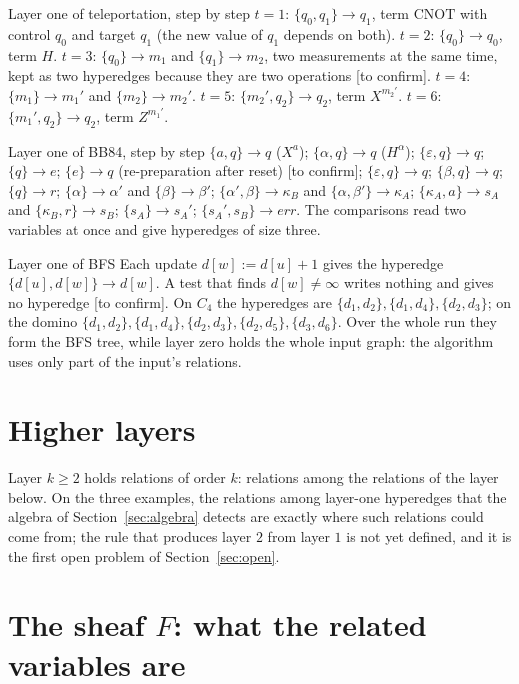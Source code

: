 \documentclass[11pt,a4paper]{article}
\newcommand{\tc}{\textsf{[to confirm]}}
\begin{document}
\begin{ex}{Layer one of teleportation, step by step}
$t=1$: $\{q_0,q_1\}\to q_1$, term $\mathrm{CNOT}$ with control $q_0$ and target $q_1$ (the new value of $q_1$ depends on both). $t=2$: $\{q_0\}\to q_0$, term $H$. $t=3$: $\{q_0\}\to m_1$ and $\{q_1\}\to m_2$, two measurements at the same time, kept as two hyperedges because they are two operations \tc. $t=4$: $\{m_1\}\to m_1'$ and $\{m_2\}\to m_2'$. $t=5$: $\{m_2',q_2\}\to q_2$, term $X^{m_2'}$. $t=6$: $\{m_1',q_2\}\to q_2$, term $Z^{m_1'}$.
\end{ex}

\begin{ex}{Layer one of BB84, step by step}
$\{a,q\}\to q$ ($X^a$); $\{\alpha,q\}\to q$ ($H^\alpha$); $\{\varepsilon,q\}\to q$; $\{q\}\to e$; $\{e\}\to q$ (re-preparation after reset) \tc; $\{\varepsilon,q\}\to q$; $\{\beta,q\}\to q$; $\{q\}\to r$; $\{\alpha\}\to\alpha'$ and $\{\beta\}\to\beta'$; $\{\alpha',\beta\}\to\kappa_B$ and $\{\alpha,\beta'\}\to\kappa_A$; $\{\kappa_A,a\}\to s_A$ and $\{\kappa_B,r\}\to s_B$; $\{s_A\}\to s_A'$; $\{s_A',s_B\}\to\mathit{err}$. The comparisons read two variables at once and give hyperedges of size three.
\end{ex}

\begin{ex}{Layer one of BFS}
Each update $d[w]:=d[u]+1$ gives the hyperedge $\{d[u],d[w]\}\to d[w]$. A test that finds $d[w]\neq\infty$ writes nothing and gives no hyperedge \tc. On $C_4$ the hyperedges are $\{d_1,d_2\},\{d_1,d_4\},\{d_2,d_3\}$; on the domino $\{d_1,d_2\},\{d_1,d_4\},\{d_2,d_3\},\{d_2,d_5\},\{d_3,d_6\}$. Over the whole run they form the BFS tree, while layer zero holds the whole input graph: the algorithm uses only part of the input's relations.
\end{ex}

\section{Higher layers}\label{sec:higher}

Layer $k\ge2$ holds relations of order $k$: relations among the relations of the layer below. On the three examples, the relations among layer-one hyperedges that the algebra of Section~\ref{sec:algebra} detects are exactly where such relations could come from; the rule that produces layer $2$ from layer $1$ is not yet defined, and it is the first open problem of Section~\ref{sec:open}.

\section{The sheaf $F$: what the related variables are}\label{sec:sheaf}
\end{document}
